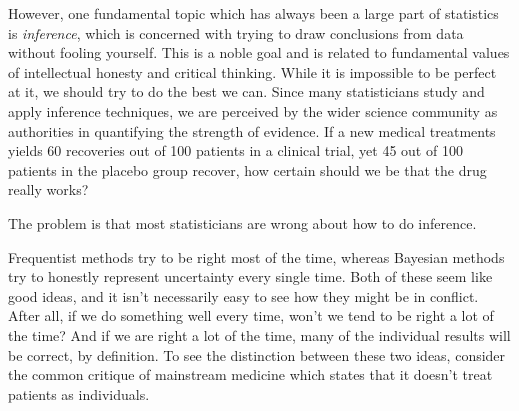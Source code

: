 \documentclass[a4paper, 12pt]{article}
\begin{document}
However, one fundamental topic which has always been a large part of
statistics is {\em inference}, which is concerned with trying to
draw conclusions from data without fooling yourself. This is a noble goal
and is related to fundamental values of intellectual honesty and critical
thinking. While
it is impossible to be perfect at it, we should try to do the best
we can. Since many statisticians study and apply inference techniques,
we are perceived by the wider science community as authorities
in quantifying the strength of evidence. If a new medical treatments yields 60
recoveries out of 100 patients in a clinical trial, yet 45 out of 100 patients
in the placebo group recover, how certain should we be that the drug really works?



The problem is that most statisticians are wrong about how to do inference.

Frequentist methods try to be right most of the time, whereas Bayesian methods
try to honestly represent uncertainty every single time. Both of these seem
like good ideas, and it isn't necessarily easy to see how they might be in
conflict. After all, if we do something well every time, won't we tend to be
right a lot of the time? And if we are right a lot of the time, many of the
individual results will be correct, by definition.
To see the distinction between these two ideas,
consider the common critique of mainstream medicine which states that it
doesn't treat patients as individuals.
\end{document}

